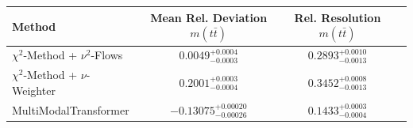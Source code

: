     \begin{tabular}{lccc}
        \toprule
        Method & Mean Rel. Deviation $m(t\bar{t})$ & Rel. Resolution $m(t\bar{t})$ \\
        \midrule
        $\chi^2$-Method + $\nu^2$-Flows & $0.0049^{+0.0004}_{-0.0003}$ & $0.2893^{+0.0010}_{-0.0013}$ \\
        $\chi^2$-Method + $\nu$-Weighter & $0.2001^{+0.0003}_{-0.0004}$ & $0.3452^{+0.0008}_{-0.0013}$ \\
        MultiModalTransformer & $-0.13075^{+0.00020}_{-0.00026}$ & $0.1433^{+0.0003}_{-0.0004}$ \\
        \bottomrule
    \end{tabular}